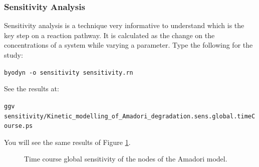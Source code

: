 \documentclass[a4paper, 11pt]{article}
\begin{document}
  \subsubsection{Sensitivity Analysis}
  Sensitivity analysis is a technique very informative to understand which is the key step on a reaction pathway.
  It is calculated as the change on the concentrations of a system while varying a parameter.
  Type the following for the study:
  \begin{center}
    \texttt{byodyn -o sensitivity sensitivity.rn}
  \end{center}
  See the results at:
  \begin{center}
    \scriptsize{\texttt{ggv sensitivity/Kinetic\_modelling\_of\_Amadori\_degradation.sens.global.timeCourse.ps}}
  \end{center}
  You will see the same results of Figure \ref{amadoriSensitivity}.
  \begin{figure}[!h]
    \begin{center}
      \caption{Time course global sensitivity of the nodes of the Amadori model.}\label{amadoriSensitivity}
    \end{center}
  \end{figure}
\end{document}
